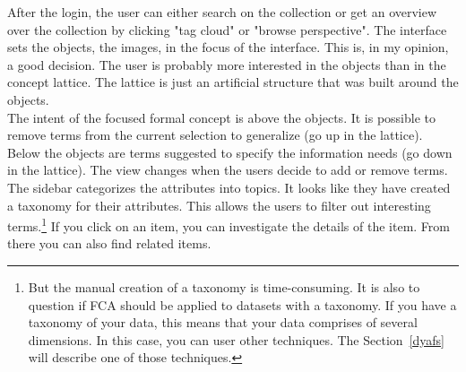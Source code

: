 \documentclass[11pt]{report}
\begin{document}
After the login, the user can either search on the collection or get an overview over the collection by clicking "tag cloud" or "browse perspective". The interface sets the objects, the images, in the focus of the interface. This is, in my opinion, a good decision. The user is probably more interested in the objects than in the concept lattice. The lattice is just an artificial structure that was built around the objects. \\
 
The intent of the focused formal concept is above the objects. It is possible to remove terms from the current selection to generalize (go up in the lattice). Below the objects are terms suggested to specify the information needs (go down in the lattice). The view changes when the users decide to add or remove terms. The sidebar categorizes the attributes into topics. It looks like they have created a taxonomy for their attributes. This allows the users to filter out interesting terms.\footnote{But the manual creation of a taxonomy is time-consuming. It is also to question if FCA should be applied to datasets with a taxonomy. If you have a taxonomy of your data, this means that your data comprises of several dimensions. In this case, you can user other techniques. The Section~\ref{dyafs} will describe one of those techniques.} If you click on an item, you can investigate the details of the item. From there you can also find related items.\\
 
\end{document}
